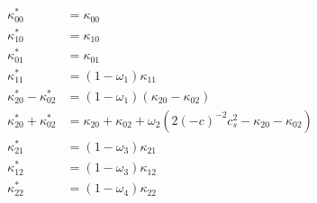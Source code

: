 \begin{equation}
  \begin{aligned}
    \kappa_{00}^{*} & = \kappa_{00} \\
    \kappa_{10}^{*} & = \kappa_{10} \\
    \kappa_{01}^{*} & = \kappa_{01} \\
    \kappa_{11}^{*} & = (1-\omega_1)\kappa_{11} \\
    \kappa_{20}^{*} - \kappa_{02}^{*}
      & = (1-\omega_1) (\kappa_{20} - \kappa_{02}) \\
    \kappa_{20}^{*} + \kappa_{02}^{*}
      & = \kappa_{20} + \kappa_{02} + \omega_2 \left( 2 {(-c)}^{-2} c_s^2 - \kappa_{20} - \kappa_{02} \right) \\
    \kappa_{21}^{*} & = (1-\omega_3)\kappa_{21} \\
    \kappa_{12}^{*} & = (1-\omega_3)\kappa_{12} \\
    \kappa_{22}^{*} & = (1-\omega_4)\kappa_{22}
  \end{aligned}
\end{equation} 

